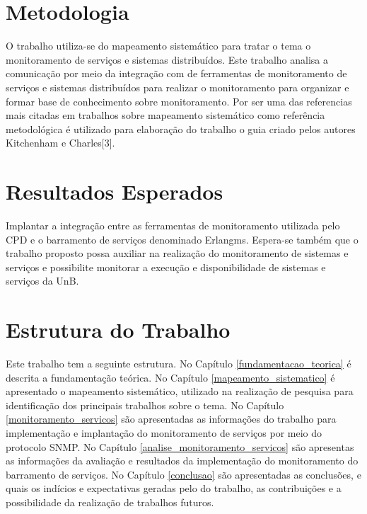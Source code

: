 \section{Metodologia}

O trabalho utiliza-se do mapeamento sistemático para tratar o tema o monitoramento de serviços e sistemas distribuídos. Este trabalho analisa a comunicação por meio da integração com de ferramentas de monitoramento de serviços e sistemas distribuídos para realizar o monitoramento para organizar e formar base de conhecimento sobre monitoramento. Por ser uma das referencias mais citadas em trabalhos sobre mapeamento sistemático  como referência metodológica é utilizado para elaboração do trabalho o guia criado pelos autores Kitchenham e Charles[3].


\section{Resultados Esperados}

Implantar a integração entre as ferramentas de monitoramento utilizada pelo \acrshort{CPD} e o barramento de serviços denominado Erlangms\cite{Agilar}. Espera-se também que o trabalho proposto possa auxiliar na realização do monitoramento de sistemas e serviços e possibilite monitorar a execução e disponibilidade de sistemas e serviços da \acrshort{UnB}.


\section{Estrutura do Trabalho}

Este trabalho tem a seguinte estrutura. No Capítulo \ref{fundamentacao_teorica} é descrita a fundamentação teórica. No Capítulo \ref{mapeamento_sistematico} é apresentado o mapeamento sistemático, utilizado na realização de pesquisa para identificação dos principais trabalhos sobre o tema. No Capítulo \ref{monitoramento_servicos} são apresentadas as informações do trabalho para implementação e implantação do monitoramento de serviços por meio do protocolo \acrshort{SNMP}. No Capítulo \ref{analise_monitoramento_servicos} são apresentas as informações da avaliação e resultados da implementação do monitoramento do barramento de serviços. No Capítulo \ref{conclusao} são apresentadas as conclusões, e quais os indícios e expectativas geradas pelo do trabalho, as contribuições e a possibilidade da realização de trabalhos futuros.